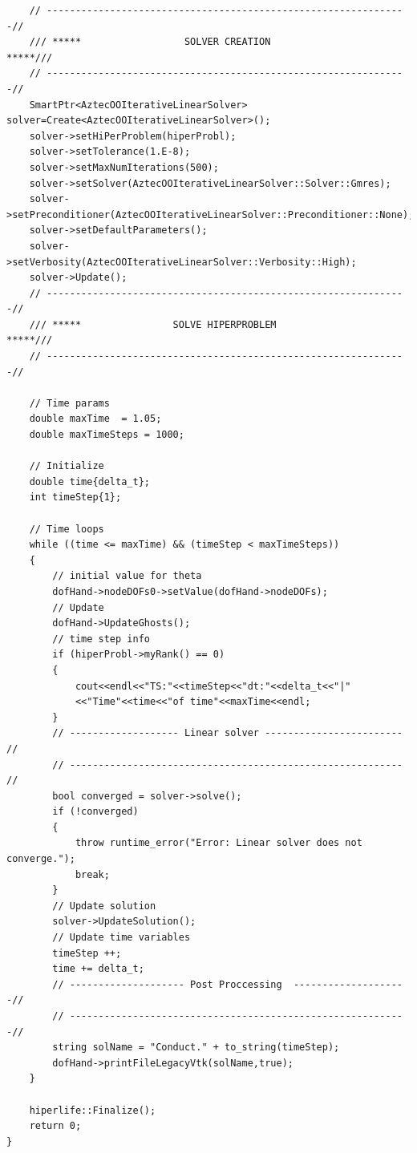 \documentclass[]{article}
\begin{document}
\begin{lstlisting}
	// ---------------------------------------------------------------//
	/// *****                  SOLVER CREATION                  *****///
	// ---------------------------------------------------------------//
	SmartPtr<AztecOOIterativeLinearSolver> solver=Create<AztecOOIterativeLinearSolver>();
	solver->setHiPerProblem(hiperProbl);
	solver->setTolerance(1.E-8);
	solver->setMaxNumIterations(500);
	solver->setSolver(AztecOOIterativeLinearSolver::Solver::Gmres);
	solver->setPreconditioner(AztecOOIterativeLinearSolver::Preconditioner::None);
	solver->setDefaultParameters();
	solver->setVerbosity(AztecOOIterativeLinearSolver::Verbosity::High);
	solver->Update();
	// ---------------------------------------------------------------//
	/// *****                SOLVE HIPERPROBLEM                 *****///
	// ---------------------------------------------------------------//
		
	// Time params
	double maxTime  = 1.05;
	double maxTimeSteps = 1000;
		
	// Initialize
	double time{delta_t};
	int timeStep{1};
		
	// Time loops
	while ((time <= maxTime) && (timeStep < maxTimeSteps))
	{
		// initial value for theta
		dofHand->nodeDOFs0->setValue(dofHand->nodeDOFs);
		// Update 
		dofHand->UpdateGhosts();
		// time step info
		if (hiperProbl->myRank() == 0)
		{
			cout<<endl<<"TS:"<<timeStep<<"dt:"<<delta_t<<"|"
			<<"Time"<<time<<"of time"<<maxTime<<endl; 
		}
		// ------------------- Linear solver ------------------------ //
		// ---------------------------------------------------------- //
		bool converged = solver->solve();
		if (!converged)
		{
			throw runtime_error("Error: Linear solver does not converge.");
			break;
		}
		// Update solution
		solver->UpdateSolution(); 
		// Update time variables
		timeStep ++;
		time += delta_t;
		// -------------------- Post Proccessing  --------------------//
		// -----------------------------------------------------------//
		string solName = "Conduct." + to_string(timeStep);
		dofHand->printFileLegacyVtk(solName,true);
	}
		
	hiperlife::Finalize();
	return 0;
}	
\end{lstlisting}
\end{document}
